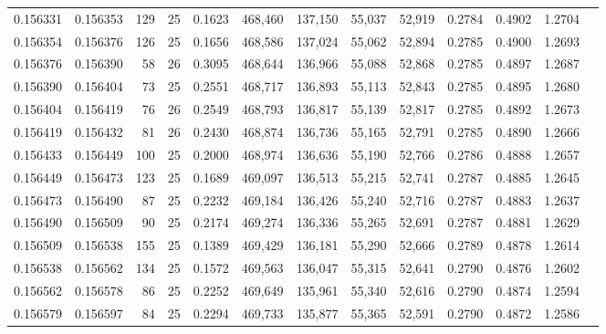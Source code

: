 \begin{tabular}{rrrrrrrrrrrrr}
0.156331 & 0.156353 &   129 &  25 &                                     0.1623 & 468,460 & 137,150 &  55,037 &  52,919 & 0.2784 & 0.4902 & 1.2704 \\
0.156354 & 0.156376 &   126 &  25 &                                     0.1656 & 468,586 & 137,024 &  55,062 &  52,894 & 0.2785 & 0.4900 & 1.2693 \\
0.156376 & 0.156390 &    58 &  26 &                                     0.3095 & 468,644 & 136,966 &  55,088 &  52,868 & 0.2785 & 0.4897 & 1.2687 \\
0.156390 & 0.156404 &    73 &  25 &                                     0.2551 & 468,717 & 136,893 &  55,113 &  52,843 & 0.2785 & 0.4895 & 1.2680 \\
0.156404 & 0.156419 &    76 &  26 &                                     0.2549 & 468,793 & 136,817 &  55,139 &  52,817 & 0.2785 & 0.4892 & 1.2673 \\
0.156419 & 0.156432 &    81 &  26 &                                     0.2430 & 468,874 & 136,736 &  55,165 &  52,791 & 0.2785 & 0.4890 & 1.2666 \\
0.156433 & 0.156449 &   100 &  25 &                                     0.2000 & 468,974 & 136,636 &  55,190 &  52,766 & 0.2786 & 0.4888 & 1.2657 \\
0.156449 & 0.156473 &   123 &  25 &                                     0.1689 & 469,097 & 136,513 &  55,215 &  52,741 & 0.2787 & 0.4885 & 1.2645 \\
0.156473 & 0.156490 &    87 &  25 &                                     0.2232 & 469,184 & 136,426 &  55,240 &  52,716 & 0.2787 & 0.4883 & 1.2637 \\
0.156490 & 0.156509 &    90 &  25 &                                     0.2174 & 469,274 & 136,336 &  55,265 &  52,691 & 0.2787 & 0.4881 & 1.2629 \\
0.156509 & 0.156538 &   155 &  25 &                                     0.1389 & 469,429 & 136,181 &  55,290 &  52,666 & 0.2789 & 0.4878 & 1.2614 \\
0.156538 & 0.156562 &   134 &  25 &                                     0.1572 & 469,563 & 136,047 &  55,315 &  52,641 & 0.2790 & 0.4876 & 1.2602 \\
0.156562 & 0.156578 &    86 &  25 &                                     0.2252 & 469,649 & 135,961 &  55,340 &  52,616 & 0.2790 & 0.4874 & 1.2594 \\
0.156579 & 0.156597 &    84 &  25 &                                     0.2294 & 469,733 & 135,877 &  55,365 &  52,591 & 0.2790 & 0.4872 & 1.2586 \\

\end{tabular}
